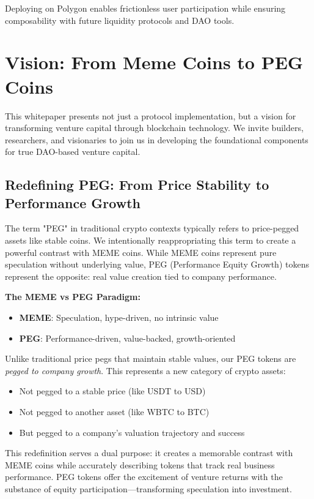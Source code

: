 \documentclass[conference]{IEEEtran}
\begin{document}
Deploying on Polygon enables frictionless user participation while ensuring composability with future liquidity protocols and DAO tools.

\section{Vision: From Meme Coins to PEG Coins}

This whitepaper presents not just a protocol implementation, but a vision for transforming venture capital through blockchain technology. We invite builders, researchers, and visionaries to join us in developing the foundational components for true DAO-based venture capital.

\subsection{Redefining PEG: From Price Stability to Performance Growth}

The term "PEG" in traditional crypto contexts typically refers to price-pegged assets like stable coins. We intentionally reappropriating this term to create a powerful contrast with MEME coins. While MEME coins represent pure speculation without underlying value, PEG (Performance Equity Growth) tokens represent the opposite: real value creation tied to company performance.

\textbf{The MEME vs PEG Paradigm:}
\begin{itemize}
    \item \textbf{MEME}: Speculation, hype-driven, no intrinsic value
    \item \textbf{PEG}: Performance-driven, value-backed, growth-oriented
\end{itemize}

Unlike traditional price pegs that maintain stable values, our PEG tokens are \textit{pegged to company growth}. This represents a new category of crypto assets:
\begin{itemize}
    \item Not pegged to a stable price (like USDT to USD)
    \item Not pegged to another asset (like WBTC to BTC)
    \item But pegged to a company's valuation trajectory and success
\end{itemize}

This redefinition serves a dual purpose: it creates a memorable contrast with MEME coins while accurately describing tokens that track real business performance. PEG tokens offer the excitement of venture returns with the substance of equity participation—transforming speculation into investment.
\end{document}
